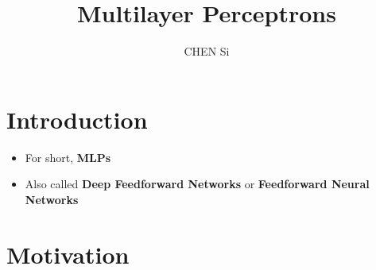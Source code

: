 \documentclass[12pt, a4paper]{article}
\title{Multilayer Perceptrons}
\author{CHEN Si}
\date{}
\begin{document}
 

\maketitle


\section{Introduction}

    \begin{itemize}
        \item For short, \textbf{MLPs}
        \item Also called 
            \textbf{Deep Feedforward Networks} or
            \textbf{Feedforward Neural Networks}
    \end{itemize}


\section{Motivation}
\end{document}
